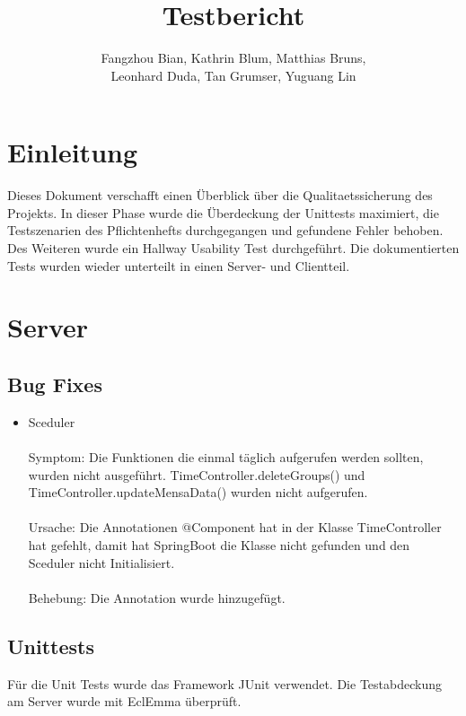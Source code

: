 \documentclass[a4paper]{scrreprt}
\begin{document}
\title{Testbericht}
\author{Fangzhou Bian, Kathrin Blum, Matthias Bruns, \\Leonhard Duda, Tan Grumser, Yuguang Lin}
\maketitle
\tableofcontents



\chapter{Einleitung}

Dieses Dokument verschafft einen Überblick über die \Gls{Qualitaetssicherung} des Projekts. In dieser Phase wurde die Überdeckung der \Gls{Unittest}s maximiert, die Testszenarien des Pflichtenhefts durchgegangen und gefundene Fehler behoben. Des Weiteren wurde ein \Gls{Hallway Usability Test} durchgeführt. Die dokumentierten Tests wurden wieder unterteilt in einen Server- und Clientteil.

\chapter{Server}

\section{Bug Fixes}

\begin{itemize}
\item Sceduler\\ \\
Symptom: Die Funktionen die einmal täglich aufgerufen werden sollten, wurden nicht ausgeführt. TimeController.deleteGroups() und TimeController.updateMensaData() wurden nicht aufgerufen.\\ \\
Ursache: Die Annotationen @Component hat in der Klasse TimeController hat gefehlt, damit hat SpringBoot die Klasse nicht gefunden und den Sceduler nicht Initialisiert.\\ \\
Behebung:  Die Annotation wurde hinzugefügt.
\end{itemize}


\section{Unittests}
Für die Unit Tests wurde das Framework JUnit verwendet. Die Testabdeckung am Server wurde mit EclEmma überprüft.
\end{document}
